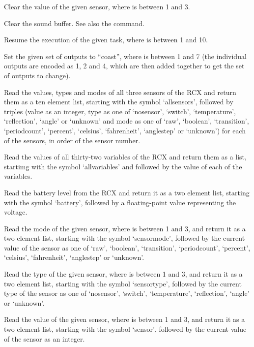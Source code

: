   Clear the value of the given sensor, where  is between 1 and 3.
  
  Clear the sound buffer.
  See also the  command.
  
  Resume the execution of the given task, where  is between 1 and 10.
  
  Set the given set of outputs to ``coast'', where  is between 1 and 7
  (the individual outputs are encoded as 1, 2 and 4, which are then added together to get the set of outputs to change).
  
  Read the values, types and modes of all three sensors of the RCX and return them as a ten element list, starting with the
  symbol `allsensors', followed by triples (value as an integer, type as one of `nosensor', `switch', `temperature', `reflection',
  `angle' or `unknown' and mode as one of `raw', `boolean', `transition', `periodcount', `percent', `celsius', `fahrenheit',
  `anglestep' or `unknown') for each of the sensors, in order of the sensor number.
  
  Read the values of all thirty-two variables of the RCX and return them as a list, startimg with the
  symbol `allvariables' and followed by the value of each of the variables.
  
  Read the battery level from the RCX and return it as a two element list, starting with the symbol `battery', followed
  by a floating-point value representing the voltage.
  
  Read the mode of the given sensor, where  is between 1 and 3, and return it as a two element list,
  starting with the symbol `sensormode', followed by the current value of the sensor as one of `raw', `boolean', `transition', `periodcount', `percent', `celsius', `fahrenheit',
  `anglestep' or `unknown'.
  
  Read the type of the given sensor, where  is between 1 and 3, and return it as a two element list,
  starting with the symbol `sensortype', followed by the current type of the sensor as one of `nosensor', `switch', `temperature',
  `reflection', `angle' or `unknown'.
  
  Read the value of the given sensor, where  is between 1 and 3, and return it as a two element list,
  starting with the symbol `sensor', followed by the current value of the sensor as an integer.
  
